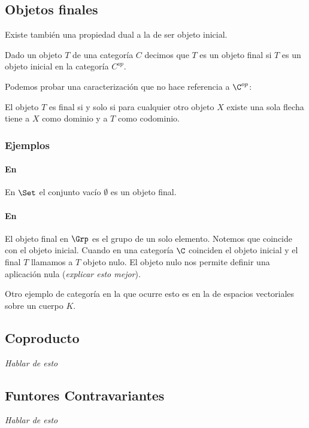 \subsection{Objetos finales}
Existe también una propiedad dual a la de ser objeto inicial.

\begin{definition}
Dado un objeto $T$ de una categoría $C$ decimos que
$T$ es un objeto final si $T$ es un objeto inicial en la
categoría $C^{op}$.
\end{definition}

Podemos probar una caracterización que no hace referencia a
$\C^{op}$:

\begin{proposition}
El objeto $T$ es final si y solo si para cualquier otro objeto
$X$ existe una sola flecha tiene a $X$ como dominio y a $T$ como
codominio.
\end{proposition}

\subsubsection{Ejemplos}
\paragraph{En \Set}
En $\Set$ el conjunto vacío $\emptyset$ es un objeto final.

\paragraph{En \Grp}
El objeto final en $\Grp$ es el grupo de un solo elemento. Notemos
que coincide con el objeto inicial. Cuando en una categoría $\C$ coinciden
el objeto inicial y el final $T$ llamamos a $T$ objeto nulo. El objeto
nulo nos permite definir una aplicación nula (\textit{explicar esto mejor}).

Otro ejemplo de categoría en la que ocurre esto es en la de espacios vectoriales
sobre un cuerpo $K$.


\subsection{Coproducto}
\textit{Hablar de esto}

\subsection{Funtores Contravariantes}
\textit{Hablar de esto}

